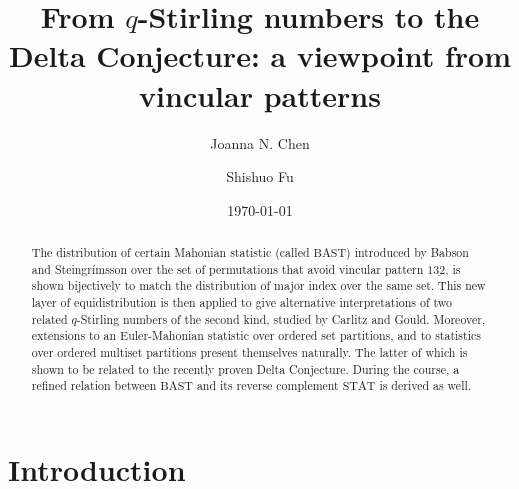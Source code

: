 \documentclass[12pt]{amsart}
\numberwithin{equation}{section}
\theoremstyle{plain}
\theoremstyle{definition}
\begin{document}
\title[From $q$-Stirling numbers to the Delta Conjecture]{From $q$-Stirling numbers to the Delta Conjecture: a viewpoint from vincular patterns
}

\author[J.~N.~Chen]{Joanna N. Chen}
\address{College of Science, Tianjin University of Technology, Tianjin 300384, P.R. China.}

\author[S.~Fu]{Shishuo Fu}
\address{College of Mathematics and Statistics, Chongqing University, Chongqing 401331, P.R. China.}

\date{\today}


\begin{abstract}
The distribution of certain Mahonian statistic (called $\mathrm{BAST}$) introduced by Babson and Steingr\'{i}msson over the set of permutations that avoid vincular pattern $1\underline{32}$, is shown bijectively to match the distribution of major index over the same set. This new layer of equidistribution is then applied to give alternative interpretations of two related $q$-Stirling numbers of the second kind, studied by Carlitz and Gould. Moreover, extensions to an Euler-Mahonian statistic over ordered set partitions, and to statistics over ordered multiset partitions present themselves naturally. The latter of which is shown to be related to the recently proven Delta Conjecture. During the course, a refined relation between $\mathrm{BAST}$ and its reverse complement $\mathrm{STAT}$ is derived as well.
\end{abstract}


\maketitle

\tableofcontents


\section{Introduction}\label{sec:intro}
\end{document}
